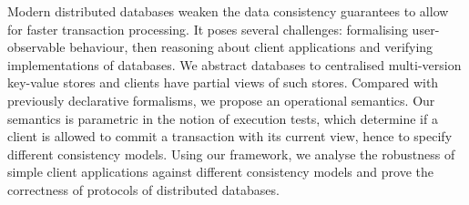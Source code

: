 Modern distributed databases weaken the data consistency guarantees 
to allow for faster transaction processing. 
It poses several challenges: formalising user-observable behaviour,
then reasoning about client applications 
and verifying implementations of databases.
We abstract databases to centralised multi-version key-value stores and 
clients have partial views of such stores.
Compared with previously declarative formalisms,
we propose an operational semantics. 
Our semantics is parametric in the notion of execution tests, 
which determine if a client is allowed to commit a transaction with its current view,
hence to specify different consistency models. 
Using our framework, 
we analyse the robustness of simple client applications 
against different consistency models and prove the correctness 
of protocols of distributed databases.
